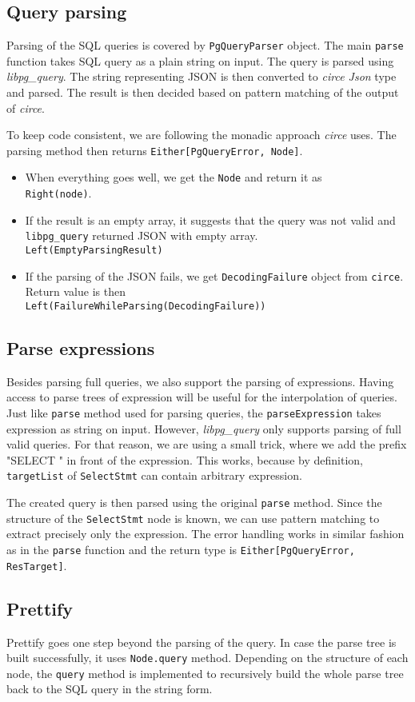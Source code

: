 \subsection{Query parsing}
Parsing of the SQL queries is covered by \texttt{PgQueryParser} object. The main \texttt{parse} function takes SQL query as a plain string on input. The query is parsed using \textit{libpg\_query}. The string representing JSON is then converted to \textit{circe Json} type and parsed. The result is then decided based on pattern matching of the output of \textit{circe}. 

To keep code consistent, we are following the monadic approach \textit{circe} uses. The parsing method then returns \texttt{Either[PgQueryError, Node]}.
\begin{itemize}
    \item When everything goes well, we get the \texttt{Node} and return it as \\ \texttt{Right(node)}.
    \item If the result is an empty array, it suggests that the query was not valid and \texttt{libpg\_query} returned JSON with empty array. \\
    \texttt{Left(EmptyParsingResult)}
    \item If the parsing of the JSON fails, we get \texttt{DecodingFailure} object from \texttt{circe}. Return value is then \\ \texttt{Left(FailureWhileParsing(DecodingFailure))}
\end{itemize}

\subsection{Parse expressions}
Besides parsing full queries, we also support the parsing of expressions. Having access to parse trees of expression will be useful for the interpolation of queries. Just like \texttt{parse} method used for parsing queries, the \texttt{parseExpression} takes expression as string on input. However, \textit{libpg\_query} only supports parsing of full valid queries. For that reason, we are using a small trick, where we add the prefix "SELECT " in front of the expression. This works, because by definition, \texttt{targetList} of \texttt{SelectStmt} can contain arbitrary expression.

The created query is then parsed using the original \texttt{parse} method. Since the structure of the \texttt{SelectStmt} node is known, we can use pattern matching to extract precisely only the expression. The error handling works in similar fashion as in the \texttt{parse} function and the return type is \texttt{Either[PgQueryError, ResTarget]}.

\subsection{Prettify}
Prettify goes one step beyond the parsing of the query. In case the parse tree is built successfully, it uses \texttt{Node.query} method. Depending on the structure of each node, the \texttt{query} method is implemented to recursively build the whole parse tree back to the SQL query in the string form.


